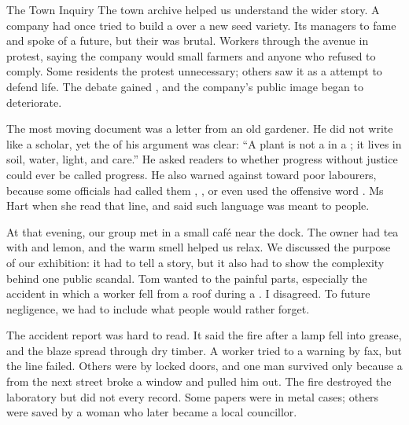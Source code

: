 \documentclass[12pt]{nextbook}
\begin{document}
\begin{readersection}{The Town Inquiry}
The town archive helped us understand the wider story. A  company had once tried to build a  over a new seed variety. Its managers  to fame and spoke of a  future, but their  was brutal. Workers  through the avenue in protest, saying the company would  small farmers and  anyone who refused to comply. Some residents  the protest unnecessary; others saw it as a  attempt to defend  life. The debate gained , and the company’s public image began to deteriorate.

The most moving document was a letter from an old gardener. He did not write like a scholar, yet the  of his argument was clear: “A plant is not a  in a ; it lives in soil, water, light, and care.” He asked readers to  whether progress without justice could ever be called progress. He also warned against  toward poor labourers, because some officials had called them , , or even used the offensive word . Ms Hart  when she read that line, and said such language was meant to  people.

At  that evening, our group met in a small café near the dock. The owner had  tea with  and lemon, and the warm smell helped us relax. We discussed the  purpose of our exhibition: it had to tell a  story, but it also had to show the  complexity behind one public scandal. Tom wanted to  the painful parts, especially the  accident in which a worker fell from a roof during a . I disagreed. To  future negligence, we had to include what people would rather forget.

The accident report was hard to read. It said the fire  after a lamp fell into grease, and the blaze spread through dry timber. A worker tried to  a warning by fax, but the line failed. Others were  by locked doors, and one man survived only because a  from the next street broke a window and pulled him out. The fire destroyed the laboratory but did not  every record. Some papers were  in metal cases; others were saved by a woman who later became a local councillor.


\end{readersection}
\end{document}
